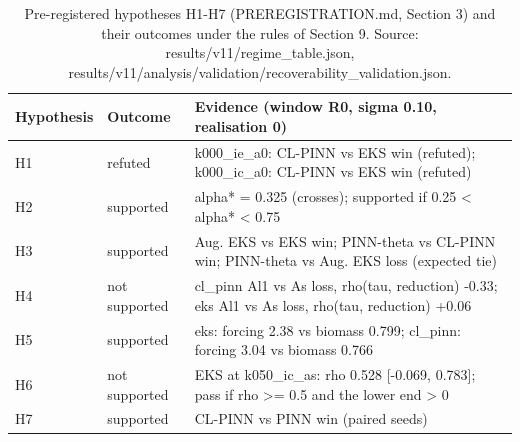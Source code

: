 \begin{table}[t]
\centering
\caption{Pre-registered hypotheses H1-H7 (PREREGISTRATION.md, Section 3) and their outcomes under the rules of Section 9. Source: results/v11/regime\_table.json, results/v11/analysis/validation/recoverability\_validation.json.}
\label{tab:si-hypotheses}
\footnotesize
\begin{tabular}{lll}
\toprule
Hypothesis & Outcome & Evidence (window R0, sigma 0.10, realisation 0) \\
\midrule
H1 & refuted & k000\_ie\_a0: CL-PINN vs EKS win (refuted); k000\_ic\_a0: CL-PINN vs EKS win (refuted) \\
H2 & supported & alpha* = 0.325 (crosses); supported if 0.25 < alpha* < 0.75 \\
H3 & supported & Aug. EKS vs EKS win; PINN-theta vs CL-PINN win; PINN-theta vs Aug. EKS loss (expected tie) \\
H4 & not supported & cl\_pinn Al1 vs As loss, rho(tau, reduction) -0.33; eks Al1 vs As loss, rho(tau, reduction) +0.06 \\
H5 & supported & eks: forcing 2.38 vs biomass 0.799; cl\_pinn: forcing 3.04 vs biomass 0.766 \\
H6 & not supported & EKS at k050\_ic\_as: rho 0.528 [-0.069, 0.783]; pass if rho >= 0.5 and the lower end > 0 \\
H7 & supported & CL-PINN vs PINN win (paired seeds) \\
\bottomrule
\end{tabular}
\end{table}
